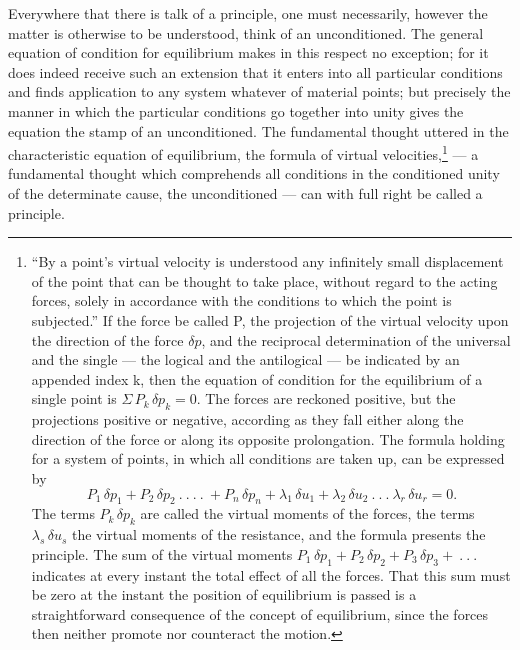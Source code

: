 \documentclass[12pt,a4paper]{book}
\begin{document}
Everywhere that there is talk of a principle, one must necessarily, however the matter is
otherwise to be understood, think of an unconditioned. The general equation of condition for
equilibrium makes in this respect no exception; for it does indeed receive such an extension
that it enters into all particular conditions and finds application to any system whatever of
material points; but precisely the manner in which the particular conditions go together into
unity gives the equation the stamp of an unconditioned. The fundamental thought uttered in
the characteristic equation of equilibrium, the formula of virtual
velocities,\footnote{%
``By a point's virtual velocity is understood any infinitely small displacement of the point
that can be thought to take place, without regard to the acting forces, solely in accordance
with the conditions to which the point is subjected.'' If the force be called P, the
projection of the virtual velocity upon the direction of the force $\delta p$, and the
reciprocal determination of the universal and the single --- the logical and the antilogical
--- be indicated by an appended index k, then the equation of condition for the equilibrium
of a single point is $\Sigma\, P_{k}\, \delta p_{k} = 0$. The forces are reckoned positive,
but the projections positive or negative, according as they fall either along the direction
of the force or along its opposite prolongation. The formula holding for a system of points,
in which all conditions are taken up, can be expressed by
\[
P_{1}\, \delta p_{1} + P_{2}\, \delta p_{2} \ .\ .\ .\ .\ + P_{n}\,
\delta p_{n} + \lambda_{1}\, \delta u_{1} + \lambda_{2}\, \delta u_{2}
\ .\ .\ .\ \lambda_{r}\, \delta u_{r} = 0.
\]
The terms $P_{k}\, \delta p_{k}$ are called the virtual moments of the forces, the terms
$\lambda_{s}\, \delta u_{s}$ the virtual moments of the resistance, and the formula presents
the principle. The sum of the virtual moments
$P_{1}\, \delta p_{1} + P_{2}\, \delta p_{2} + P_{3}\, \delta p_{3} +
\ .\ .\ .$ indicates at every instant
the total effect of all the forces. That this sum must be zero at the instant the position of
equilibrium is passed is a straightforward consequence of the concept of equilibrium, since
the forces then neither promote nor counteract the motion.}
--- a fundamental thought which comprehends all conditions in the conditioned unity of the
determinate cause, the unconditioned --- can with full right be called a principle.
\end{document}
